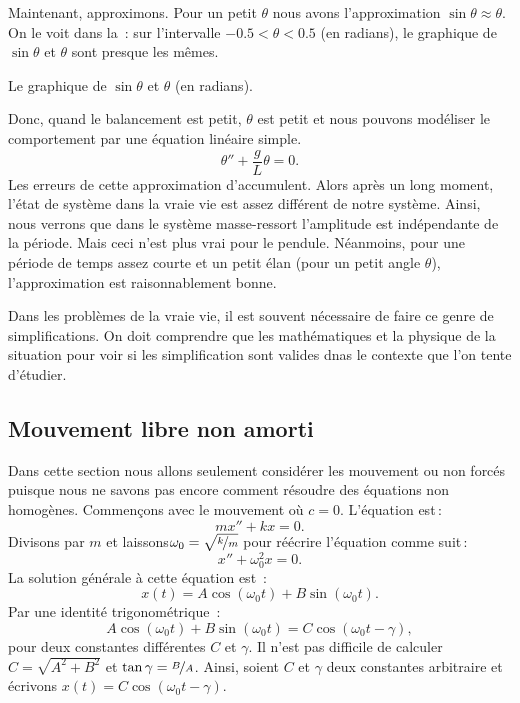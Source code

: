 Maintenant, approximons. Pour un petit $\theta$ nous avons l'approximation 
$\sin \theta \approx \theta$.  On le voit dans la \,:  sur l'intervalle 
$-0.5 < \theta < 0.5$ (en radians), le graphique de  $\sin \theta$ et $\theta$ sont presque les mêmes.

\begin{mywrapfig}{3.25in}
\capstart
{}
\caption{Le graphique de  $\sin \theta$ et $\theta$ (en radians).\label{mv:sinthetafig}}
\end{mywrapfig}

Donc, quand le balancement est petit,  $\theta$ est petit et nous pouvons modéliser le comportement par une équation linéaire simple.  
\begin{equation*}
\theta'' + \frac{g}{L} \theta = 0 .
\end{equation*}
Les erreurs de cette approximation d'accumulent. Alors après un long moment, l'état de système dans la vraie vie est assez différent de notre système. Ainsi, nous verrons que dans le système masse-ressort l'amplitude est indépendante de la période. 
Mais ceci n'est plus vrai pour le pendule.  Néanmoins, pour une période de temps assez courte et un petit élan (pour un petit angle $\theta$), l'approximation est raisonnablement bonne. 

Dans les problèmes de la vraie vie, il est souvent nécessaire de faire ce genre de simplifications.  On doit comprendre que les mathématiques et la physique de la situation pour voir si les simplification sont valides dnas le contexte que l'on tente d'étudier. 

\subsection{Mouvement libre non amorti}

Dans cette section nous allons seulement considérer les mouvement ou non forcés puisque nous ne savons pas encore comment résoudre des équations non homogènes. Commençons avec le mouvement
 où $c=0$.  L'équation est\,: 
\begin{equation*}
mx'' + kx = 0 .
\end{equation*}
Divisons par $m$ et laissons$\omega_0 = \sqrt{\nicefrac{k}{m}}$ pour réécrire l'équation comme suit\,: 
\begin{equation*}
x'' + \omega_0^2 x = 0 .
\end{equation*}
La solution générale à cette équation est \,: 
\begin{equation*}
x(t) = A \cos (\omega_0 t) + B \sin (\omega_0 t) .
\end{equation*}
Par une identité trigonométrique \,: 
\begin{equation*}
A \cos (\omega_0 t) + B \sin (\omega_0 t) =
C \cos ( \omega_0 t - \gamma ) ,
\end{equation*}
pour deux constantes différentes $C$ et $\gamma$.
Il n'est pas difficile de calculer $C= \sqrt{A^2 + B^2}$ et $\tan \gamma =
\nicefrac{B}{A}$.  Ainsi, soient
$C$ et $\gamma$ deux constantes arbitraire et écrivons 
$x(t) = C \cos ( \omega_0 t - \gamma )$.

